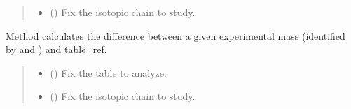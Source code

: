 \documentclass[letterpaper,10pt,english]{sphinxmanual}
\begin{document}
\begin{fulllineitems}
\begin{fulllineitems}
\begin{quote}
\begin{description}
\begin{itemize}
\item {} 
\sphinxAtStartPar
{} (\sphinxstyleliteralemphasis{\sphinxupquote{, }}) \textendash{} Fix the isotopic chain to study.

\end{itemize}

\end{description}\end{quote}

\sphinxAtStartPar
{}

\end{fulllineitems}


\begin{fulllineitems}
\label{\detokenize{source/api/setup_nuc_be_theo:nucleardatapy.nuc.setup_be_theo.setupBETheo.diff_exp}}
\pysigstartsignatures
{}
\pysigstopsignatures
\sphinxAtStartPar
Method calculates the difference between a given experimental
mass (identified by  and ) and table\_ref.
\begin{quote}\begin{description}
\begin{itemize}
\item {} 
\sphinxAtStartPar
{} () \textendash{} Fix the table to analyze.

\item {} 
\sphinxAtStartPar
{} (\sphinxstyleliteralemphasis{\sphinxupquote{, }}) \textendash{} Fix the isotopic chain to study.

\end{itemize}

\end{description}\end{quote}


\end{fulllineitems}
\end{fulllineitems}
\end{document}
